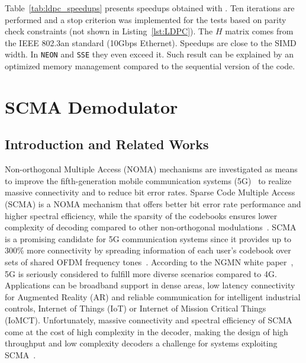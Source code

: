 Table~\ref{tab:ldpc_speedups} presents speedups obtained with \MIPP. Ten
iterations are performed and a stop criterion was implemented for the tests
based on parity check constraints (not shown in Listing~\ref{lst:LDPC}). The $H$
matrix comes from the IEEE 802.3an standard (10Gbps Ethernet). Speedups are
close to the SIMD width. In \verb|NEON| and \verb|SSE| they even exceed it. Such
result can be explained by an optimized memory management compared to the
sequential version of the code.

\section{SCMA Demodulator~\cite{Ghaffari2019}}

\subsection{Introduction and Related Works}

Non-orthogonal Multiple Access (NOMA) mechanisms are investigated as means to
improve the fifth-generation mobile communication systems (5G)~\cite{Islam2017}
to realize massive connectivity and to reduce bit error rates. Sparse Code
Multiple Access (SCMA) is a NOMA mechanism that offers better bit error rate
performance and higher spectral efficiency, while the sparsity of the codebooks
ensures lower complexity of decoding compared to other non-orthogonal
modulations~\cite{Nikopour2013}. SCMA is a promising candidate for 5G
communication systems since it provides up to 300\% more connectivity by
spreading information of each user's codebook over sets of shared OFDM frequency
tones~\cite{Altera2015}. According to the NGMN white paper~\cite{Alliance2015},
5G is seriously considered to fulfill more diverse scenarios compared to 4G.
Applications can be broadband support in dense areas, low latency connectivity
for Augmented Reality (AR) and reliable communication for intelligent industrial
controls, Internet of Things (IoT) or Internet of Mission Critical Things
(IoMCT). Unfortunately, massive connectivity and spectral efficiency of SCMA
come at the cost of high complexity in the decoder, making the design of high
throughput and low complexity decoders a challenge for systems exploiting
SCMA~\cite{Lu2015}.

